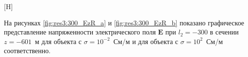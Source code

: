 \documentclass[a4paper,14pt]{article}
\makeatletter
\renewenvironment{figure}[1][\fps@figure]{
  \edef\@tempa{\noexpand\@float{figure}[#1]}
  \@tempa
  \addtocounter{foofigure}{1}
}{
  \end@float
}
\renewcommand{\Re}{\mathop{\mathrm{Re}}\nolimits}
\makeatother
\begin{document}
\begin{figure}[H]
	\centering
	\text{~~}
	\caption{$\Re(\mathbf{E}_y)$ при $l_2=-300$}
	\label{fig:res3:300_EyR}
\end{figure}

На рисунках \ref{fig:res3:300_EzR_a} и \ref{fig:res3:300_EzR_b} показано графическое представление напряженности электрического поля $\mathbf{E}$ при $l_2=-300$ в сечении $z=-601$~м для объекта с $\sigma=10^{-2}$~См/м и для объекта с $\sigma=10^{2}$~См/м соответственно.
\end{document}
